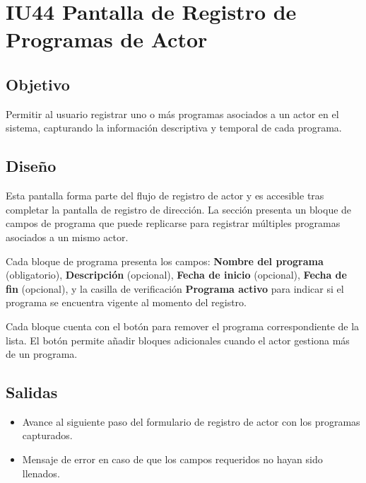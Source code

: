 \section{IU44 Pantalla de Registro de Programas de Actor}
\subsection{Objetivo}
Permitir al usuario registrar uno o más programas asociados a un actor en el 
sistema, capturando la información descriptiva y temporal de cada programa.

\subsection{Diseño}
Esta pantalla  forma 
parte del flujo de registro de actor y es accesible tras completar la pantalla 
de registro de dirección. La sección presenta un bloque de campos de programa 
que puede replicarse para registrar múltiples programas asociados a un mismo 
actor.

Cada bloque de programa presenta los campos: \textbf{Nombre del programa} 
(obligatorio), \textbf{Descripción} (opcional), \textbf{Fecha de inicio} 
(opcional), \textbf{Fecha de fin} (opcional), y la casilla de verificación 
\textbf{Programa activo} para indicar si el programa se encuentra vigente al 
momento del registro.

Cada bloque cuenta con el botón  para remover el programa 
correspondiente de la lista. El botón  permite añadir 
bloques adicionales cuando el actor gestiona más de un programa.


\subsection{Salidas}
\begin{itemize}
	\item Avance al siguiente paso del formulario de registro de actor con los 
	programas capturados.
	\item Mensaje de error  en 
	caso de que los campos requeridos no hayan sido llenados.
\end{itemize}

